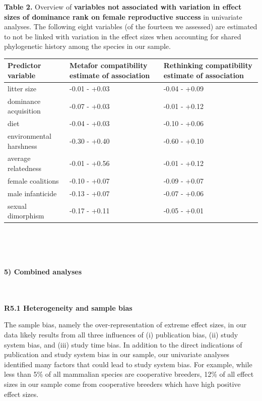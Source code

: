 \documentclass[
]{article}
\begin{document}
\textbf{Table 2.} Overview of \textbf{variables not associated with
variation in effect sizes of dominance rank on female reproductive
success} in univariate analyses. The following eight variables (of the
fourteen we assessed) are estimated to not be linked with variation in
the effect sizes when accounting for shared phylogenetic history among
the species in our sample.

\begin{tabu} to 
\hline
Predictor variable & Metafor compatibility estimate of association & Rethinking compatibility estimate of association\\
\hline
litter size & -0.01 - +0.03 & -0.04 - +0.09\\
\hline
dominance acquisition & -0.07 - +0.03 & -0.01 - +0.12\\
\hline
diet & -0.04 - +0.03 & -0.10 - +0.06\\
\hline
environmental harshness & -0.30 - +0.40 & -0.60 - +0.10\\
\hline
average relatedness & -0.01 - +0.56 & -0.01 - +0.12\\
\hline
female coalitions & -0.10 - +0.07 & -0.09 - +0.07\\
\hline
male infanticide & -0.13 - +0.07 & -0.07 - +0.06\\
\hline
sexual dimorphism & -0.17 - +0.11 & -0.05 - +0.01\\
\hline
\end{tabu}

~

~

\hypertarget{combined-analyses}{%
\paragraph{\texorpdfstring{\textbf{5) Combined
analyses}}{5) Combined analyses}}\label{combined-analyses}}

~

\textbf{R5.1 Heterogeneity and sample bias}

The sample bias, namely the over-representation of extreme effect sizes,
in our data likely results from all three influences of (i) publication
bias, (ii) study system bias, and (iii) study time bias. In addition to
the direct indications of publication and study system bias in our
sample, our univariate analyses identified many factors that could lead
to study system bias. For example, while less than 5\% of all mammalian
species are cooperative breeders, 12\% of all effect sizes in our sample
come from cooperative breeders which have high positive effect sizes.
\end{document}
